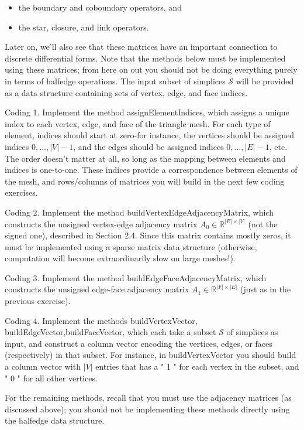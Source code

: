 \documentclass[10pt]{article}
\begin{document}
\begin{itemize}
  \item[-] the boundary and coboundary operators, and
  \item[-] the star, closure, and link operators.
\end{itemize}

Later on, we'll also see that these matrices have an important connection to discrete differential forms. Note that the methods below must be implemented using these matrices; from here on out you should not be doing everything purely in terms of halfedge operations. The input subset of simplices $\mathcal{S}$ will be provided as a data structure containing sets of vertex, edge, and face indices.

Coding 1. Implement the method assignElementIndices, which assigns a unique index to each vertex, edge, and face of the triangle mesh. For each type of element, indices should start at zero-for instance, the vertices should be assigned indices $0, \ldots,|V|-1$, and the edges should be assigned indices $0, \ldots,|E|-1$, etc. The order doesn't matter at all, so long as the mapping between elements and indices is one-to-one. These indices provide a correspondence between elements of the mesh, and rows/columns of matrices you will build in the next few coding exercises.

Coding 2. Implement the method buildVertexEdgeAdjacencyMatrix, which constructs the unsigned vertex-edge adjacency matrix $A_{0} \in \mathbb{R}^{|E| \times|V|}$ (not the signed one), described in Section 2.4. Since this matrix contains mostly zeros, it must be implemented using a sparse matrix data structure (otherwise, computation will become extraordinarily slow on large meshes!).

Coding 3. Implement the method buildEdgeFaceAdjacencyMatrix, which constructs the unsigned edge-face adjacency matrix $A_{1} \in \mathbb{R}^{|F| \times|E|}$ (just as in the previous exercise).

Coding 4. Implement the methods buildVertexVector, buildEdgeVector,buildFaceVector, which each take a subset $\mathcal{S}$ of simplices as input, and construct a column vector encoding the vertices, edges, or faces (respectively) in that subset. For instance, in buildVertexVector you should build a column vector with $|V|$ entries that has a " 1 " for each vertex in the subset, and " 0 " for all other vertices.

For the remaining methods, recall that you must use the adjacency matrices (as discussed above); you should not be implementing these methods directly using the halfedge data structure.
\end{document}
